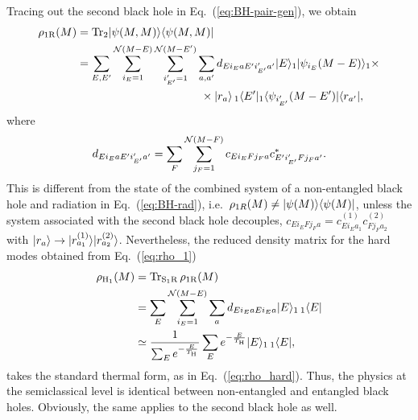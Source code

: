 \documentclass[12pt]{article}
\begin{document}
Tracing out the second black hole in Eq.~(\ref{eq:BH-pair-gen}), 
we obtain
%
\begin{align}
  \rho_{1 {\rm R}}(M) &= {\rm Tr}_2 \ket{\psi(M,M)} \bra{\psi(M,M)} 
\nonumber\\
  &= \sum_{E,E'} \sum_{i_E = 1}^{{\cal N}(M-E)} 
    \sum_{i'_{E'} = 1}^{{\cal N}(M-E')} \sum_{a,a'} 
    d_{E i_E a E' i'_{E'} a'} \ket{E}_1 \ket{\psi_{i_E}(M-E)}_1 \times \nonumber\\
  & \qquad\qquad\qquad\qquad\qquad\quad \times \ket{r_a}\, {}_1\bra{E'} {}_1\bra{\psi_{i'_{E'}}(M-E')} 
    \bra{r_{a'}},
\label{eq:rho_1}
\end{align}
%
where
%
\begin{equation}
  d_{E i_E a E' i'_{E'} a'} = \sum_F \sum_{j_F = 1}^{{\cal N}(M-F)} 
    c_{E i_E F j_F a} c_{E' i'_{E'} F j_F a'}^*.
\label{eq:c_EE'}
\end{equation}
%
This is different from the state of the combined system of a 
non-entangled black hole and radiation in Eq.~(\ref{eq:BH-rad}), 
i.e.\ $\rho_{1R}(M) \neq | \psi(M) \rangle \langle \psi(M) |$, unless 
the system associated with the second black hole decouples, 
$c_{E i_E F j_F a} = c^{(1)}_{E i_E a_1} c^{(2)}_{F j_F a_2}$ with 
$| r_a \rangle \rightarrow | r^{(1)}_{a_1} \rangle | r^{(2)}_{a_2} \rangle$. 
Nevertheless, the reduced density matrix for the hard modes obtained 
from Eq.~(\ref{eq:rho_1})
%
\begin{align}
  \rho_{{\rm H}_1}(M) &= {\rm Tr}_{{\rm S}_1 {\rm R}}\, 
    \rho_{1 {\rm R}}(M) 
\nonumber\\
  &= \sum_E \sum_{i_E = 1}^{{\cal N}(M-E)} \sum_a 
    d_{E i_E a E i_E a} \ket{E}_1\, {}_1\bra{E} 
\nonumber\\
  &\simeq \frac{1}{\sum_E e^{-\frac{E}{T_{\rm H}}}} 
    \sum_E e^{-\frac{E}{T_{\rm H}}} \ket{E}_1\, {}_1\bra{E},
\label{eq:rho_H1}
\end{align}
%
takes the standard thermal form, as in Eq.~(\ref{eq:rho_hard}). 
Thus, the physics at the semiclassical level is identical between 
non-entangled and entangled black holes.  Obviously, the same 
applies to the second black hole as well.
\end{document}
